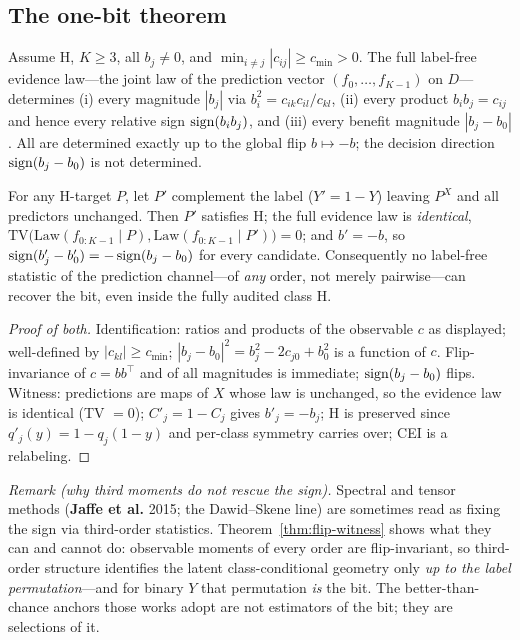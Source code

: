 \subsection{The one-bit theorem}\label{sec:onebit-thm}

\begin{theorem}\label{thm:onebit-id}
Assume H, $K\ge3$, all $b_j\neq0$, and $\min_{i\ne j}|c_{ij}|\ge c_{\min}>0$. The full
label-free evidence law---the joint law of the prediction vector
$(f_0,\dots,f_{K-1})$ on $D$---determines (i) every magnitude $|b_j|$ via
$b_i^2=c_{ik}c_{il}/c_{kl}$, (ii) every product $b_ib_j=c_{ij}$ and hence every relative
sign $\operatorname{sign}(b_ib_j)$, and (iii) every benefit magnitude $|b_j-b_0|$. All are determined
exactly up to the global flip $b\mapsto-b$; the decision direction $\operatorname{sign}(b_j-b_0)$ is
not determined.
\end{theorem}

\begin{theorem}\label{thm:flip-witness}
For any H-target $P$, let $P'$ complement the label ($Y'=1-Y$) leaving $P^X$ and all
predictors unchanged. Then $P'$ satisfies H; the full evidence law is \emph{identical},
$\mathrm{TV}\big(\mathrm{Law}(f_{0:K-1}\mid P),\mathrm{Law}(f_{0:K-1}\mid P')\big)=0$;
and $b'=-b$, so $\operatorname{sign}(b'_j-b'_0)=-\operatorname{sign}(b_j-b_0)$ for every candidate. Consequently no
label-free statistic of the prediction channel---of \emph{any} order, not merely
pairwise---can recover the bit, even inside the fully audited class H.
\end{theorem}

\begin{proof}[Proof of both]
Identification: ratios and products of the observable $c$ as displayed; well-defined by
$|c_{kl}|\ge c_{\min}$; $|b_j-b_0|^2=b_j^2-2c_{j0}+b_0^2$ is a function of $c$.
Flip-invariance of $c=bb^\top$ and of all magnitudes is immediate; $\operatorname{sign}(b_j-b_0)$
flips. Witness: predictions are maps of $X$ whose law is unchanged, so the evidence law
is identical (TV $=0$); $C'_j=1-C_j$ gives $b'_j=-b_j$; H is preserved since
$q'_j(y)=1-q_j(1-y)$ and per-class symmetry carries over; CEI is a relabeling.
\end{proof}

\noindent\emph{Remark (why third moments do not rescue the sign).} Spectral and tensor
methods (\textbf{Jaffe et al.} 2015; the Dawid--Skene line) are sometimes read as fixing
the sign via third-order statistics. Theorem~\ref{thm:flip-witness} shows what they can
and cannot do: observable moments of every order are flip-invariant, so third-order
structure identifies the latent class-conditional geometry only \emph{up to the label
permutation}---and for binary $Y$ that permutation \emph{is} the bit. The
better-than-chance anchors those works adopt are not estimators of the bit; they are
selections of it.

